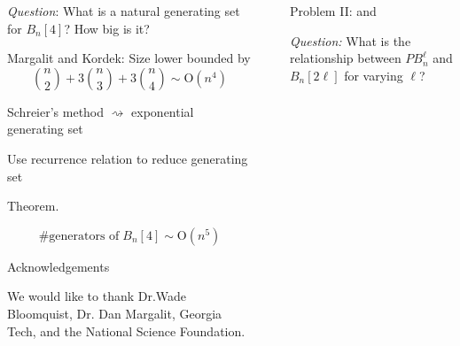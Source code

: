 \documentclass[final]{beamer}
\newlength{\sepwidth}
\newlength{\colwidth}
\newcommand{\separatorcolumn}{\begin{column}{\sepwidth}\end{column}}
\begin{document}
\begin{frame}[t]
\begin{columns}[t]
\begin{column}{\colwidth}
\begin{block}
\begin{huge}
 \vspace*{5mm} \emph{Question}: What is a natural generating set for $B_n[4]$? How big is it?
\end{huge} 

\begin{huge}

Margalit and Kordek: Size lower bounded by 
  $${n\choose 2}+3{n\choose 3}+3{n\choose 4}\sim \text{O}(n^4)$$
 
 \end{huge}


\begin{huge}

Schreier's method $\rightsquigarrow$ exponential generating set
 
Use recurrence relation to reduce generating set


\vspace*{-1mm}
{\bf {\begin{huge} Theorem. \end{huge}}}  \begin{Huge}
$${ \text{\# generators of} \; B_n[4]\sim \text{O}(n^5)}$$
\end{Huge}
  


\end{huge}
\end{block} 

\begin{block}{\begin{huge} Acknowledgements \end{huge}}

\begin{huge}
 We would like to thank Dr.\@ Wade Bloomquist, Dr. Dan Margalit, Georgia Tech, and the National Science Foundation.
 \end{huge}
  \end{block}
\end{column}


  \separatorcolumn

\begin{column}{\colwidth}

 \vspace*{-3mm} \begin{block}{
  \begin{huge}
    Problem II:  and 
  \end{huge}} 

\begin{huge} \vspace*{5mm}  \emph{Question:} What is the relationship between $PB_n^\ell$ and $B_n[2\ell]$ for varying $\ell$?
\end{huge}


\end{block}
\end{column}
\end{columns}
\end{frame}
\end{document}

